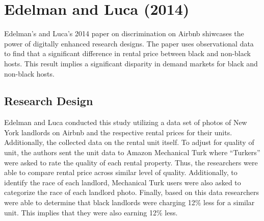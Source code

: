 \documentclass[dvips,12pt]{article}
\begin{document}
\section{Edelman and Luca (2014)}

Edelman’s and Luca’s 2014 paper on discrimination on Airbnb shiwcases the power of digitally enhanced research designs. The paper uses observational data to find that a significant difference in rental price between black and non-black hosts. This result implies a significant disparity in demand markets for black and non-black hosts.

\subsection{Research Design}

Edelman and Luca conducted this study utilizing a data set of photos of New York landlords on Airbnb and the respective rental prices for their units. Additionally, the collected data on the rental unit itself. To adjust for quality of unit, the authors sent the unit data to Amazon Mechanical Turk where “Turkers” were asked to rate the quality of each rental property. Thus, the researchers were able to compare rental price across similar level of quality. Additionally, to identify the race of each landlord, Mechanical Turk users were also asked to categorize the race of each landlord photo. Finally, based on this data researchers were able to determine that black landlords were charging 12\% less for a similar unit. This implies that they were also earning 12\% less.
\end{document}
